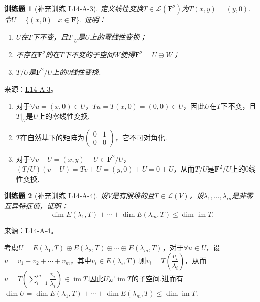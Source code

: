 \documentclass[UTF8,12pt,a4paper,fontset=fandol]{ctexart}
\newtheorem{exercise}{训练题}[section]
\begin{document}
\begin{exercise}[补充训练 L14-A-3]\label{prob:L14-A-3}
定义线性变换$T\in \mathcal{L}(\mathbf{F}^2)$为$T(x,y)=(y,0)$. 令$U=\{(x,0) \mid x\in\mathbf{F}\}$. 证明：
        \begin{enumerate}
            \item $U$在$T$下不变，且$T|_{U}$是$U$上的零线性变换；

            \item 不存在$\mathbf{F}^2$的在$T$下不变的子空间$W$使得$\mathbf{F}^2=U\oplus W$；

            \item $T/U$是$\mathbf{F}^2/U$上的0线性变换.
        \end{enumerate}
\end{exercise}
\noindent 来源：\href{https://github.com/yhwu-is/Linear-Algebra-Left-Undone/blob/new/%E8%AE%B2%E4%B9%89/%E4%B8%93%E9%A2%98/14%20%E7%9B%B8%E4%BC%BC%E6%A0%87%E5%87%86%E5%BD%A2%EF%BC%9A%E5%8A%A8%E6%9C%BA%E4%B8%8E%E5%9F%BA%E7%A1%80.tex}{L14-A-3}。
\begin{solve}
\begin{enumerate}
                \item 对于$\forall u=(x,0)\in U$，$Tu=T(x,0)=(0,0)\in U$，因此$U$在$T$下不变，且$T|_{U}$是$U$上的零线性变换.
                \item $T$在自然基下的矩阵为$\begin{pmatrix}
                    0 & 1 \\ 0 & 0
                \end{pmatrix}$，它不可对角化.
                \item 对于$\forall v+U=(x,y)+U\in \mathbf{F}^2/U$，$(T/U)(v+U)=Tv+U=(y,0)+U=0+U$，从而$T/U$是$\mathbf{F}^2/U$上的$0$线性变换.
            \end{enumerate}
\end{solve}

\begin{exercise}[补充训练 L14-A-4]\label{prob:L14-A-4}
设$V$是有限维的且$T\in \mathcal{L}(V)$，设$\lambda_1,\ldots,\lambda_m$是非零互异特征值，证明：
        \[ \dim E(\lambda_1,T)+\cdots+\dim E(\lambda_m,T)\leqslant\dim\operatorname{im} T. \]
\end{exercise}
\noindent 来源：\href{https://github.com/yhwu-is/Linear-Algebra-Left-Undone/blob/new/%E8%AE%B2%E4%B9%89/%E4%B8%93%E9%A2%98/14%20%E7%9B%B8%E4%BC%BC%E6%A0%87%E5%87%86%E5%BD%A2%EF%BC%9A%E5%8A%A8%E6%9C%BA%E4%B8%8E%E5%9F%BA%E7%A1%80.tex}{L14-A-4}。
\begin{solve}
考虑$U=E(\lambda_1,T)\oplus E(\lambda_2,T) \oplus \cdots \oplus E(\lambda_m,T)$，对于$\forall u\in U$，设$u=v_1+v_2+\cdots+v_m$，其中$v_i\in E(\lambda_i,T)$.则$v_i=T(\dfrac{v_i}{\lambda_i})$，从而$u=T(\sum\limits_{i=1}^{m}\dfrac{v_i}{\lambda_i}) \in \operatorname{im} T$.因此$U$是$\operatorname{im} T$的子空间.进而有$\dim U=\dim E(\lambda_1,T)+\cdots+\dim E(\lambda_m,T) \leqslant \dim \operatorname{im} T$.
\end{solve}
\end{document}
